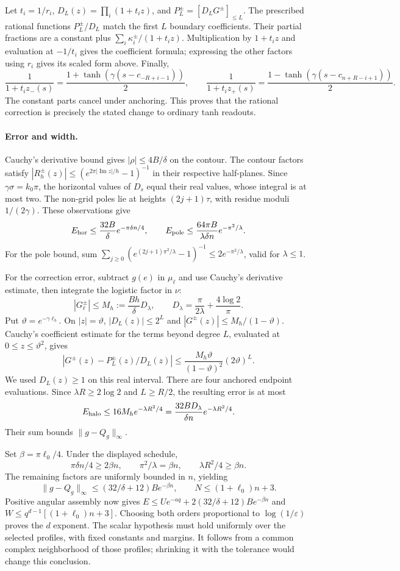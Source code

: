 \documentclass[11pt,letterpaper]{article}
\newcommand{\eps}{\varepsilon}
\theoremstyle{definition}
\theoremstyle{remark}
\begin{document}
Let \(t_i=1/r_i\), \(D_L(z)=\prod_i(1+t_i z)\), and
\(P_L^\pm=[D_LG^\pm]_{\le L}\). The prescribed rational functions
\(P_L^\pm/D_L\) match the first \(L\) boundary coefficients. Their partial
fractions are a constant plus \(\sum_i\kappa_i^\pm/(1+t_i z)\).
Multiplication by \(1+t_i z\) and evaluation at \(-1/t_i\) gives the
coefficient formula; expressing the other factors using \(r_i\) gives
its scaled form above. Finally,
\[
 \frac1{1+t_i z_-(s)}=\frac{1+\tanh(\gamma(s-c_{-R+i-1}))}{2},
 \qquad
 \frac1{1+t_i z_+(s)}=\frac{1-\tanh(\gamma(s-c_{n+R-i+1}))}{2}.
\]
The constant parts cancel under anchoring. This proves that the rational
correction is precisely the stated change to ordinary tanh readouts.

\paragraph{Error and width.}
Cauchy's derivative bound gives \(|\rho|\le4B/\delta\) on the contour.
The contour factors satisfy
\(|R_h^\pm(z)|\le(e^{2\pi|\operatorname{Im}z|/h}-1)^{-1}\)
in their respective half-planes. Since \(\gamma\sigma=k_0\pi\), the
horizontal values of \(D_s\) equal their real values, whose integral is at
most two. The non-grid poles lie at heights \((2j+1)\tau\), with residue
moduli \(1/(2\gamma)\). These observations give
\[
 E_{\rm hor}\le\frac{32B}{\delta}e^{-\pi\delta n/4},\qquad
 E_{\rm pole}\le\frac{64\pi B}{\lambda\delta n}e^{-\pi^2/\lambda}.
\]
For the pole bound, sum
\(\sum_{j\ge0}(e^{(2j+1)\pi^2/\lambda}-1)^{-1}
\le2e^{-\pi^2/\lambda}\), valid for \(\lambda\le1\).

For the correction error, subtract \(g(e)\) in \(\mu_\ell\) and use
Cauchy's derivative estimate, then integrate the logistic factor in \(\nu\):
\[
 |G_\ell^\pm|\le M_h:=\frac{Bh}{\delta}D_\lambda,
 \qquad D_\lambda=\frac\pi{2\lambda}+\frac{4\log2}{\pi}.
\]
Put \(\vartheta=e^{-\gamma\ell_h}\). On \(|z|=\vartheta\),
\(|D_L(z)|\le2^L\) and \(|G^\pm(z)|\le M_h/(1-\vartheta)\).
Cauchy's coefficient estimate for the terms beyond degree \(L\), evaluated
at \(0\le z\le\vartheta^2\), gives
\[
 |G^\pm(z)-P_L^\pm(z)/D_L(z)|
 \le\frac{M_h\vartheta}{(1-\vartheta)^2}(2\vartheta)^L.
\]
We used \(D_L(z)\ge1\) on this real interval. There are four anchored
endpoint evaluations. Since \(\lambda R\ge2\log2\) and \(L\ge R/2\),
the resulting error is at most
\[
 E_{\rm halo}\le16M_h e^{-\lambda R^2/4}
          =\frac{32BD_\lambda}{\delta n}e^{-\lambda R^2/4}.
\]
Their sum bounds \(\|g-Q_g\|_\infty\).

Set \(\beta=\pi \ell_0/4\). Under the displayed schedule,
\[
 \pi\delta n/4\ge2\beta n,\qquad
 \pi^2/\lambda=\beta n,\qquad
 \lambda R^2/4\ge\beta n.
\]
The remaining factors are uniformly bounded in \(n\), yielding
\[
 \|g-Q_g\|_\infty\le(32/\delta+12)B e^{-\beta n},\qquad
 N\le(1+\ell_0)n+3.
\]
Positive angular assembly now gives
\(E\le Ue^{-aq}+2(32/\delta+12)B e^{-\beta n}\) and
\(W\le q^{d-1}[(1+\ell_0)n+3]\). Choosing both orders proportional to
\(\log(1/\eps)\) proves the \(d\) exponent. The scalar hypothesis must hold
uniformly over the selected profiles, with fixed constants and margins.
It follows from a common complex neighborhood of those profiles; shrinking
it with the tolerance would change this conclusion.
\end{document}
